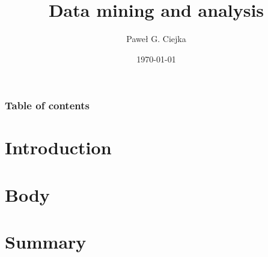 \documentclass{beamer}
\title[Data mining and analysis]{Data mining and analysis}
\author[Ciejka, P. G.]{Paweł G. Ciejka}
\institute[RobCo]{RobCo Sp. z o. o. - Poland}
\date{\today}
\begin{document}
\begin{frame}
 \maketitle
\end{frame}

\begin{frame}
\frametitle{Table of contents}
 \tableofcontents
\end{frame}

\section{Introduction}
    

\section{Body} %
    

\section{Summary}
    

% 
\end{document}
